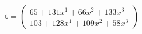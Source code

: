 \documentclass[preview]{standalone}
\begin{document}
\begin{align*}
\mathbf{t} = \begin{pmatrix}65 + 131x^{1} + 66x^{2} + 133x^{3} \\ 103 + 128x^{1} + 109x^{2} + 58x^{3}\end{pmatrix}
\end{align*}
\end{document}

